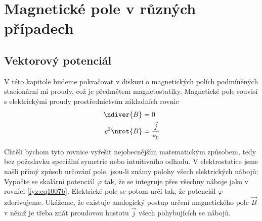 \setchaptertoc
\chapter{Magnetické pole v různých případech}\label{fyz:IIchapXIV}
  \section{Vektorový potenciál}\label{fyz:IIchapXIVsecI}
    V této kapitole budeme pokračovat v diskuzi o magnetických polích podmíněných stacionární mi
    proudy, což je předmětem magnetostatiky. Magnetické pole souvisí s elektrickými proudy
    prostřednictvím základních rovnic
    \begin{subequations}\label{fyz:eq1006}
      \begin{align}
        \ndiver{B}   &= 0                                      \label{fyz:eq1006a}  \\
        c^2\nrot{B}  &= \dfrac{\vec{j}}{\varepsilon_0}         \label{fyz:eq1006b}
      \end{align}
    \end{subequations}

    Chtěli bychom tyto rovnice vyřešit nejobecnějším matematickým způsobem, tedy bez požadavku
    speciální symetrie nebo intuitivního odhadu. V elektrostatice jsme našli přímý způsob určování
    pole, jsou-li známy polohy všech elektrických nábojů: Vypočte se skalární potenciál \(\varphi\)
    tak, že se integruje přes všechny náboje jako v rovnici \eqref{fyz:eq1007b}. Elektrické pole se
    potom určí tak, že potenciál \(\varphi\) zderivujeme. Ukážeme, že existuje analogický postup
    určení magnetického pole \(\vec{B}\) v němž je třeba znát proudovou hustotu \(\vec{j}\) všech
    pohybujících se nábojů.

